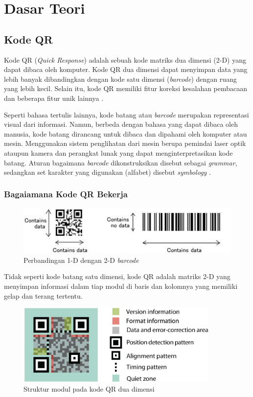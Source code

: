 \section{Dasar Teori}

\subsection{Kode QR}

Kode QR (\emph{Quick Response}) adalah sebuah kode matriks dua dimensi (2-D) yang dapat dibaca oleh komputer. Kode QR dua dimensi dapat menyimpan data yang
lebih banyak dibandingkan dengan kode satu dimensi (\emph{barcode}) dengan ruang yang lebih kecil. Selain itu, kode QR memiliki fitur koreksi kesalahan
pembacaan dan beberapa fitur unik lainnya \cite{densoqrcode}.

Seperti bahasa tertulis lainnya, kode batang atau \emph{barcode} merupakan representasi visual dari informasi. Namun, berbeda dengan bahasa yang dapat dibaca
oleh manusia, kode batang dirancang untuk dibaca dan dipahami oleh komputer atau mesin. Menggunakan sistem penglihatan dari mesin berupa pemindai laser optik
ataupun kamera dan perangkat lunak yang dapat menginterpretasikan kode batang. Aturan bagaimana \emph{barcode} dikonstruksikan disebut sebagai \emph{grammar},
sedangkan set karakter yang digunakan (alfabet) disebut \emph{symbology} \cite{densoqrcode}.

\subsubsection{Bagaiamana Kode QR Bekerja}
\begin{figure}[!ht]
	\centering
	\includegraphics[width=12cm]{contents/chapter-2/2-2dvs1dcode.jpg}
	\caption[Perbandingan 1-D dengan 2-D \emph{barcode}]{Perbandingan 1-D dengan 2-D \emph{barcode} \cite{densoqrcode}}
	\label{Fig: 2-2dvs1dcode}
\end{figure}

Tidak seperti kode batang satu dimensi, kode QR adalah matriks 2-D yang menyimpan informasi dalam tiap modul di baris dan kolomnya yang memiliki gelap dan
terang tertentu.

\begin{figure}[!ht]
	\centering
	\includegraphics[width=10cm]{contents/chapter-2/2-strukturqrasli.jpg}
	\caption[Struktur modul pada kode QR dua dimensi]{Struktur modul pada kode QR dua dimensi \cite{densoqrcode}}
	\label{Fig: 2-strukturqrasli}
\end{figure}

